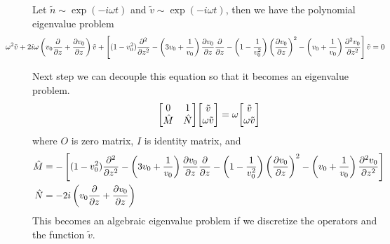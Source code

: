 \begin{proposition}
	Let $\tilde{n}\sim \exp(-i\omega t)$ and $\tilde{v} \sim \exp(-i\omega t)$, then we have the polynomial eigenvalue problem
	\begin{equation}
		\hspace{-0.5in}
		\omega^2 \tilde{v} 
		+ 2i\omega\left(v_0\pdv{}{z} + \pdv{v_0}{z}\right) \tilde{v} 
		+ \left[ (1-v_0^2)\pdv[2]{}{z} 
		-\left(3v_0 + \frac{1}{v_0}\right)\pdv{v_0}{z}\pdv{}{z} 
		- \left(1-\frac{1}{v_0^2}\right)\left(\pdv{v_0}{z}\right)^2 
		- \left(v_0+\frac{1}{v_0}\right)\pdv[2]{v_0}{z} \right]\tilde{v}
		= 0
		\label{eq:polynomial_eigenvalue_problem}
	\end{equation}
\end{proposition}

Next step we can decouple this equation so that it becomes an eigenvalue problem.
\begin{equation}
	\mqty[ 0 & 1\\ \hat{M} & \hat{N} ]\mqty[ \tilde{v}\\ \omega \tilde{v}] = \omega\mqty[ \tilde{v}\\ \omega \tilde{v}]
	\label{eq:eigenvalue-problem}
\end{equation}
where $O$ is zero matrix, $I$ is identity matrix, and
\begin{align*}
	\hat{M} &= -\left[(1-v_0^2)\pdv[2]{}{z} 
	-\left(3v_0 + \frac{1}{v_0}\right)\pdv{v_0}{z}\pdv{}{z} 
	- \left(1-\frac{1}{v_0^2}\right)\left(\pdv{v_0}{z}\right)^2 
	- \left(v_0+\frac{1}{v_0}\right)\pdv[2]{v_0}{z}\right] \\
	\hat{N} &= -2i\left(v_0\pdv{}{z} +\pdv{v_0}{z} \right) 
\end{align*}
This becomes an algebraic eigenvalue problem if we discretize the operators and the function $\tilde{v}$.
